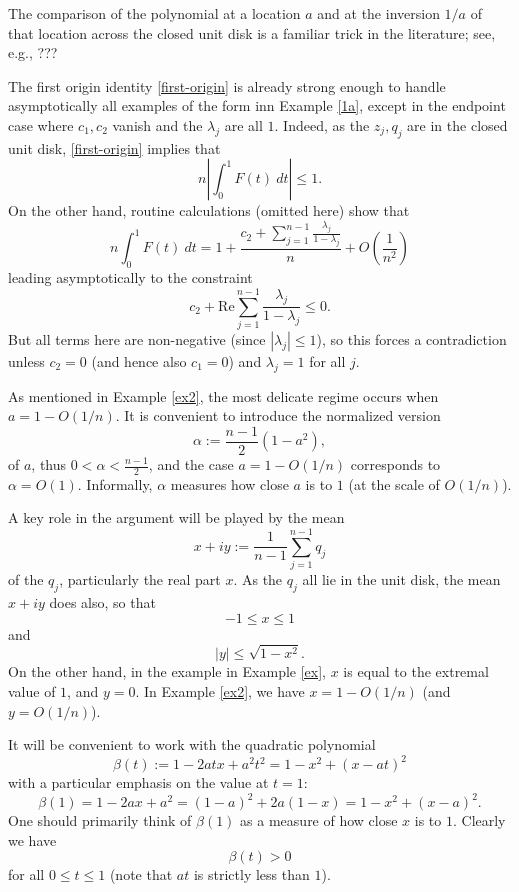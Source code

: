 \documentclass[12pt]{article}
\begin{document}
\begin{remark} The comparison of the polynomial at a location $a$ and at the inversion $1/a$ of that location across the closed unit disk is a familiar trick in the literature; see, e.g., ???
\end{remark}

\begin{remark} The first origin identity \eqref{first-origin} is already strong enough to handle asymptotically all examples of the form inn Example \ref{1a}, except in the endpoint case where $c_1, c_2$ vanish and the $\lambda_j$ are all $1$.  Indeed, as the $z_j, q_j$ are in the closed unit disk, \eqref{first-origin} implies that
    $$ n |\int_0^1 F(t)\ dt| \leq 1.$$
On the other hand, routine calculations (omitted here) show that
$$ n \int_0^1 F(t)\ dt = 1 + \frac{c_2 + \sum_{j=1}^{n-1} \frac{\lambda_j}{1-\lambda_j}}{n}
+ O(\frac{1}{n^2})$$
leading asymptotically to the constraint
$$ c_2 + \mathrm{Re} \sum_{j=1}^{n-1} \frac{\lambda_j}{1-\lambda_j} \leq 0.$$
But all terms here are non-negative (since $|\lambda_j| \leq 1$), so this forces a contradiction unless $c_2=0$ (and hence also $c_1=0$) and $\lambda_j = 1$ for all $j$.
\end{remark}

As mentioned in Example \ref{ex2}, the most delicate regime occurs when $a = 1 - O(1/n)$.  It is convenient to introduce the normalized version
\begin{equation}\label{alpha-def} 
\alpha := \frac{n-1}{2} (1-a^2),
\end{equation}
of $a$, thus $0 < \alpha < \frac{n-1}{2}$, and the case $a = 1 - O(1/n)$ corresponds to $\alpha = O(1)$.  Informally, $\alpha$ measures how close $a$ is to $1$ (at the scale of $O(1/n)$).

A key role in the argument will be played by the mean
\begin{equation}\label{xy-def}
 x + iy := \frac{1}{n-1} \sum_{j=1}^{n-1} q_j
\end{equation}
of the $q_j$, particularly the real part $x$.  As the $q_j$ all lie in the unit disk, the mean $x+iy$ does also, so that
$$ -1 \leq x \leq 1$$
and
\begin{equation}\label{ybound}
|y| \leq \sqrt{1-x^2}.
\end{equation}
On the other hand, in the example in Example \ref{ex}, $x$ is equal to the extremal value of $1$, and $y=0$.  In Example \ref{ex2}, we have $x = 1 - O(1/n)$ (and $y = O(1/n)$).

It will be convenient to work with the quadratic polynomial
\begin{equation}\label{beta-poly}
    \beta(t) := 1 - 2atx + a^2 t^2 = 1 - x^2 + (x - at)^2
\end{equation}
with a particular emphasis on the value at $t=1$:
\begin{equation}\label{beta-def} 
    \beta(1) = 1 - 2ax + a^2 = (1-a)^2 + 2a(1-x) = 1 - x^2 + (x-a)^2.
\end{equation}
One should primarily think of $\beta(1)$ as a measure of how close $x$ is to $1$. Clearly we have
$$ \beta(t) > 0$$
for all $0 \leq t \leq 1$ (note that $at$ is strictly less than $1$).
\end{document}
